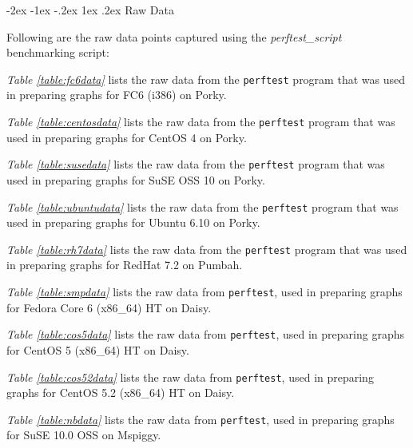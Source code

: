\documentclass[letterpaper,final,notitlepage,twocolumn,10pt,twoside]{article}
\makeatletter
\renewcommand\section{\@startsection {section}{1}{\z@}%
                                   {-2ex \@plus -1ex \@minus -.2ex}%
                                   {1ex \@plus .2ex}%
                                   {\normalfont\large\bfseries}}
\makeatother
\begin{document}
\begin{appendix}
\section{Raw Data}
\label{section:rawdata}

Following are the raw data points captured using the \textsl{perftest\_script} benchmarking script:

\textit{Table \ref{table:fc6data}} lists the raw data from the \texttt{perftest} program that was
used in preparing graphs for FC6 (i386) on Porky.

\textit{Table \ref{table:centosdata}} lists the raw data from the \texttt{perftest} program that was
used in preparing graphs for CentOS 4 on Porky.

\textit{Table \ref{table:susedata}} lists the raw data from the \texttt{perftest} program that was
used in preparing graphs for SuSE OSS 10 on Porky.

\textit{Table \ref{table:ubuntudata}} lists the raw data from the \texttt{perftest} program that was
used in preparing graphs for Ubuntu 6.10 on Porky.

\textit{Table \ref{table:rh7data}} lists the raw data from the \texttt{perftest} program that was
used in preparing graphs for RedHat 7.2 on Pumbah.

\textit{Table \ref{table:smpdata}} lists the raw data from \texttt{perftest}, used in preparing
graphs for Fedora Core 6 (x86\_64) HT on Daisy.

\textit{Table \ref{table:cos5data}} lists the raw data from \texttt{perftest}, used in preparing
graphs for CentOS 5 (x86\_64) HT on Daisy.

\textit{Table \ref{table:cos52data}} lists the raw data from \texttt{perftest}, used in preparing
graphs for CentOS 5.2 (x86\_64) HT on Daisy.

\textit{Table \ref{table:nbdata}} lists the raw data from \texttt{perftest}, used in preparing
graphs for SuSE 10.0 OSS on Mspiggy.


\end{appendix}
\end{document}
